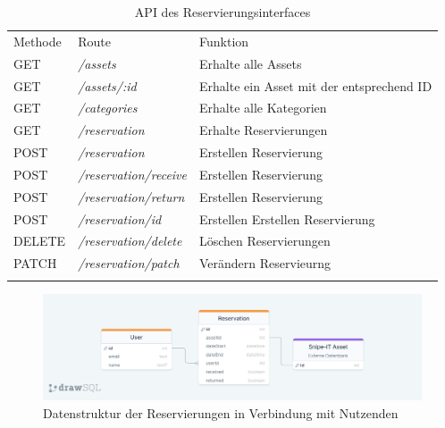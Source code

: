 \begin{table}[h]
  \centering
  \caption{API des Reservierungsinterfaces}
  \begin{tabular}{lll}
    \arrayrulecolor{maincolor}\hline
    \sffamily\color{maincolor}Methode & \sffamily\color{maincolor}Route           & \sffamily\color{maincolor}Funktion             \\
    \arrayrulecolor{maincolor}\hline
      GET               & \textit{/assets}       & Erhalte alle Assets \\
      GET               & \textit{/assets/:id}   &
      Erhalte ein Asset mit der entsprechend ID                               \\
      GET               & \textit{/categories} &
      Erhalte alle Kategorien                                        \\
      GET               & \textit{/reservation} &
      Erhalte Reservierungen                                       \\
      POST              & \textit{/reservation}       &
      Erstellen Reservierung                                            \\
      POST              & \textit{/reservation/receive}       &
      Erstellen Reservierung                                           \\
      POST              & \textit{/reservation/return}       &
      Erstellen Reservierung                                                \\
      POST              & \textit{/reservation/id}       &
      Erstellen Erstellen Reservierung                                                \\
      DELETE            & \textit{/reservation/delete}   &
      Löschen Reservierungen                         \\
      PATCH               & \textit{/reservation/patch}   & Verändern Reservieurng       \\
    \arrayrulecolor{maincolor}\hline
  \end{tabular}
  \label{table:impl-backend-routes}
\end{table}

\begin{figure}[h]
  \centering
  \includegraphics[scale=0.2]{Bilder/drawSQL-export-2022-10-09_15 56.png}
  \caption[Datenstruktur der Reservierungen in Verbindung mit Nutzenden]{Datenstruktur der Reservierungen in Verbindung mit Nutzenden}
  \label{fig:orm}
\end{figure}


